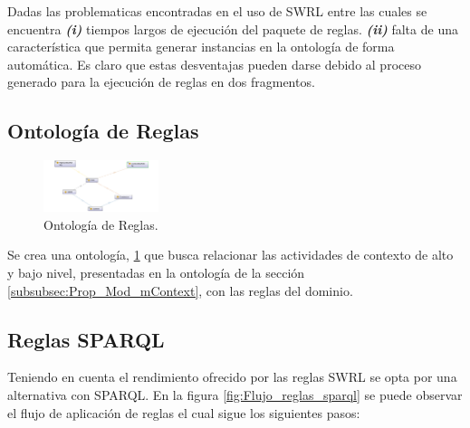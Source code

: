 



Dadas las problematicas encontradas en el uso de SWRL entre las cuales se encuentra
\textbf{\textit{(i)}} tiempos largos de ejecución del paquete de reglas.
\textbf{\textit{(ii)}} falta de una característica que permita generar instancias en la ontología de forma automática.
Es claro que estas desventajas pueden darse debido al proceso generado para la ejecución de reglas en dos fragmentos.

\subsection{Ontología de Reglas}
\label{subsec:Prop_Razonamiento_Rules_Ont}

\begin{figure}[!ht]
    \centering%
    \includegraphics[width=0.3\textwidth]{Cap3/Images/Contexto_Razonamiento_Ont_Rules}%
    \caption{Ontología de Reglas.} \label{fig:Contexto_Razonamiento_Ont_Rules}
\end{figure}

Se crea una ontología, \ref{fig:Contexto_Razonamiento_Ont_Rules} que busca relacionar las actividades de contexto de alto y bajo nivel, presentadas en la ontología de la sección \ref{subsubsec:Prop_Mod_mContext}, con las reglas del dominio.

\subsection{Reglas SPARQL}
\label{subsec:Prop_Razonamiento_SPARQL}

Teniendo en cuenta el rendimiento ofrecido por las reglas SWRL se opta por una alternativa con SPARQL. En la figura \ref{fig:Flujo_reglas_sparql} se puede observar el flujo de aplicación de reglas el cual sigue los siguientes pasos:

